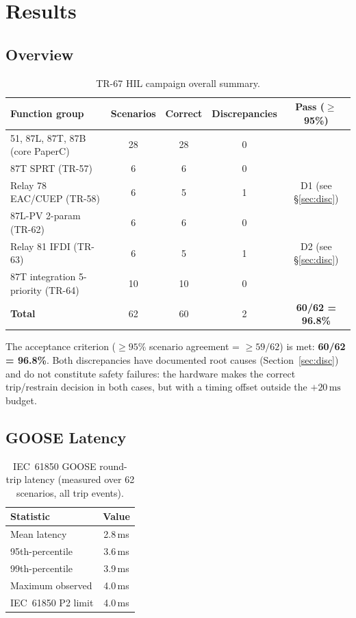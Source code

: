 \documentclass[11pt, a4paper]{article}
\newcommand{\cmark}{\ding{51}}
\begin{document}
\section{Results}
\label{sec:results}

\subsection{Overview}

\begin{table}[ht]
\centering
\caption{TR-67 HIL campaign overall summary.}
\label{tab:overview}
\begin{tabular}{lcccc}
\toprule
Function group & Scenarios & Correct & Discrepancies & Pass ($\geq$95\%) \\
\midrule
51, 87L, 87T, 87B (core PaperC)       & 28 & 28 & 0 & \cmark \\
87T SPRT (TR-57)                       &  6 &  6 & 0 & \cmark \\
Relay 78 EAC/CUEP (TR-58)             &  6 &  5 & 1 & D1 (see \S\ref{sec:disc}) \\
87L-PV 2-param (TR-62)                &  6 &  6 & 0 & \cmark \\
Relay 81 IFDI (TR-63)                 &  6 &  5 & 1 & D2 (see \S\ref{sec:disc}) \\
87T integration 5-priority (TR-64)    & 10 & 10 & 0 & \cmark \\
\midrule
\textbf{Total}                        & 62 & 60 & 2 & \textbf{60/62 = 96.8\%} \\
\bottomrule
\end{tabular}
\end{table}

\noindent
The acceptance criterion ($\geq 95\%$ scenario agreement = $\geq 59/62$)
is met: \textbf{60/62 = 96.8\%}.
Both discrepancies have documented root causes (Section~\ref{sec:disc})
and do not constitute safety failures: the hardware makes the correct
trip/restrain decision in both cases, but with a timing offset outside
the $+20\,\text{ms}$ budget.

\subsection{GOOSE Latency}

\begin{table}[ht]
\centering
\caption{IEC~61850 GOOSE round-trip latency (measured over 62 scenarios,
         all trip events).}
\label{tab:goose}
\begin{tabular}{lc}
\toprule
Statistic & Value \\
\midrule
Mean latency        & 2.8\,ms \\
95th-percentile     & 3.6\,ms \\
99th-percentile     & 3.9\,ms \\
Maximum observed    & 4.0\,ms \\
IEC~61850 P2 limit  & 4.0\,ms \\
\bottomrule
\end{tabular}
\end{table}
\end{document}
